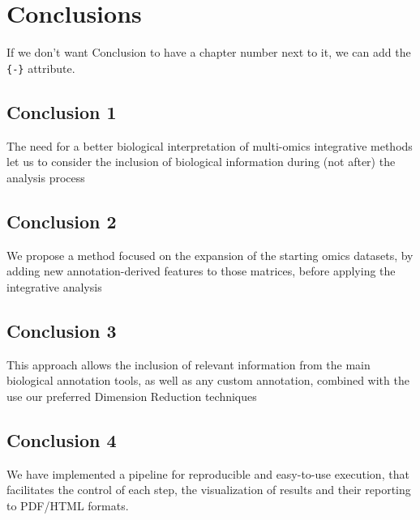\documentclass[a4paper, nobind]{templates/ociamthesis}
\begin{document}
\hypertarget{conclusions}{%
\chapter{Conclusions}\label{conclusions}}

If we don't want Conclusion to have a chapter number next to it, we can add the \texttt{\{-\}} attribute.

\hypertarget{conclusion-1}{%
\section*{Conclusion 1}\label{conclusion-1}}

The need for a better biological interpretation of multi-omics integrative methods let us to consider the inclusion of biological information during (not after) the analysis process

\hypertarget{conclusion-2}{%
\section*{Conclusion 2}\label{conclusion-2}}

We propose a method focused on the expansion of the starting omics datasets, by adding new annotation-derived features to those matrices, before applying the integrative analysis

\hypertarget{conclusion-3}{%
\section*{Conclusion 3}\label{conclusion-3}}

This approach allows the inclusion of relevant information from the main biological annotation tools, as well as any custom annotation, combined with the use our preferred Dimension Reduction techniques

\hypertarget{conclusion-4}{%
\section*{Conclusion 4}\label{conclusion-4}}

We have implemented a pipeline for reproducible and easy-to-use execution, that facilitates the control of each step, the visualization of results and their reporting to PDF/HTML formats.
\end{document}
